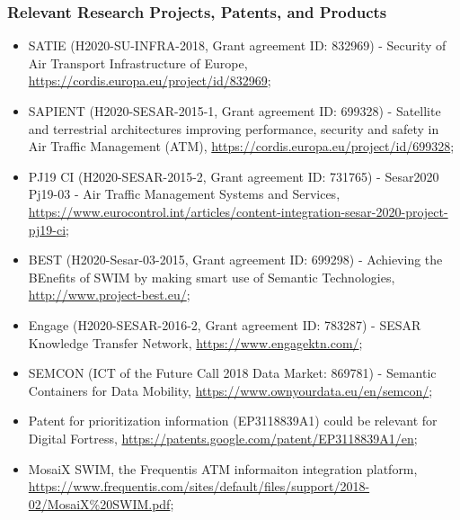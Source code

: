 \documentclass[a4paper,11pt]{article}
\begin{document}
\subsubsection*{Relevant Research Projects, Patents, and Products}

\begin{itemize}

\item SATIE (H2020-SU-INFRA-2018, Grant agreement ID: 832969) - Security of Air Transport Infrastructure of Europe, \url{https://cordis.europa.eu/project/id/832969};

\item SAPIENT (H2020-SESAR-2015-1, Grant agreement ID: 699328) - Satellite and terrestrial architectures improving performance, security and safety in Air Traffic Management (ATM), \url{https://cordis.europa.eu/project/id/699328};

\item PJ19 CI (H2020-SESAR-2015-2, Grant agreement ID: 731765) - Sesar2020 Pj19-03 - Air Traffic Management Systems and Services, \url{https://www.eurocontrol.int/articles/content-integration-sesar-2020-project-pj19-ci};

\item BEST (H2020-Sesar-03-2015, Grant agreement ID: 699298) - Achieving the BEnefits of SWIM by making smart use of Semantic Technologies, \url{http://www.project-best.eu/};

\item Engage (H2020-SESAR-2016-2, Grant agreement ID: 783287) - SESAR Knowledge Transfer Network, \url{https://www.engagektn.com/};

\item SEMCON (ICT of the Future Call 2018 Data Market: 869781) - Semantic Containers for Data Mobility, \url{https://www.ownyourdata.eu/en/semcon/};

\item Patent for prioritization information (EP3118839A1) could be relevant for Digital Fortress, \url{https://patents.google.com/patent/EP3118839A1/en};

\item MosaiX SWIM, the Frequentis ATM informaiton integration platform, \url{https://www.frequentis.com/sites/default/files/support/2018-02/MosaiX\%20SWIM.pdf}; 

\end{itemize}

\end{document}
